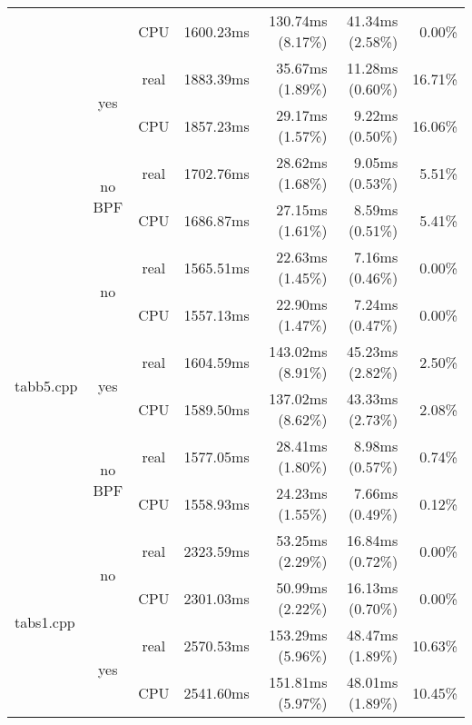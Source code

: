 \documentclass[en]{pracamgr}
\begin{document}
\begin{appendices}
\begin{small}
\begin{longtable}{|l|c|c|r|r|r|r|}
                            &                         & CPU  & 1600.23ms & 130.74ms (8.17\%) & 41.34ms (2.58\%) & 0.00\% \\*
                            \cline{2-7}
                            & \multirow{2}{*}{yes}    & real & 1883.39ms & 35.67ms (1.89\%) & 11.28ms (0.60\%) & 16.71\% \\*
                            &                         & CPU  & 1857.23ms & 29.17ms (1.57\%) & 9.22ms (0.50\%) & 16.06\% \\*
                            \cline{2-7}
                            & \multirow{2}{*}{no BPF} & real & 1702.76ms & 28.62ms (1.68\%) & 9.05ms (0.53\%) & 5.51\% \\*
                            &                         & CPU  & 1686.87ms & 27.15ms (1.61\%) & 8.59ms (0.51\%) & 5.41\% \\
\hline
\multirow{6}{*}{tabb5.cpp}  & \multirow{2}{*}{no}     & real & 1565.51ms & 22.63ms (1.45\%) & 7.16ms (0.46\%) & 0.00\% \\*
                            &                         & CPU  & 1557.13ms & 22.90ms (1.47\%) & 7.24ms (0.47\%) & 0.00\% \\*
                            \cline{2-7}
                            & \multirow{2}{*}{yes}    & real & 1604.59ms & 143.02ms (8.91\%) & 45.23ms (2.82\%) & 2.50\% \\*
                            &                         & CPU  & 1589.50ms & 137.02ms (8.62\%) & 43.33ms (2.73\%) & 2.08\% \\*
                            \cline{2-7}
                            & \multirow{2}{*}{no BPF} & real & 1577.05ms & 28.41ms (1.80\%) & 8.98ms (0.57\%) & 0.74\% \\*
                            &                         & CPU  & 1558.93ms & 24.23ms (1.55\%) & 7.66ms (0.49\%) & 0.12\% \\
\hline
\multirow{6}{*}{tabs1.cpp}  & \multirow{2}{*}{no}     & real & 2323.59ms & 53.25ms (2.29\%) & 16.84ms (0.72\%) & 0.00\% \\*
                            &                         & CPU  & 2301.03ms & 50.99ms (2.22\%) & 16.13ms (0.70\%) & 0.00\% \\*
                            \cline{2-7}
                            & \multirow{2}{*}{yes}    & real & 2570.53ms & 153.29ms (5.96\%) & 48.47ms (1.89\%) & 10.63\% \\*
                            &                         & CPU  & 2541.60ms & 151.81ms (5.97\%) & 48.01ms (1.89\%) & 10.45\% \\*

\end{longtable}
\end{small}
\end{appendices}
\end{document}
